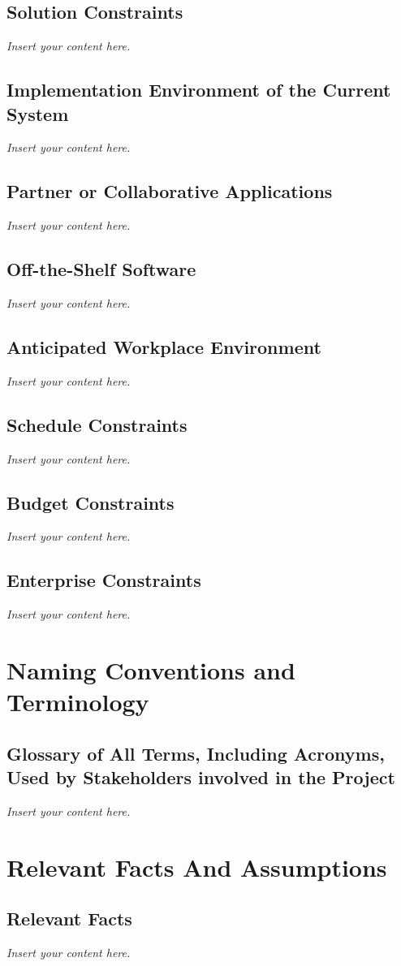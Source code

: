 \documentclass[12pt]{article}
\newcommand{\lips}{\textit{Insert your content here.}}
\begin{document}
\subsection{Solution Constraints}
\lips
\subsection{Implementation Environment of the Current System}
\lips
\subsection{Partner or Collaborative Applications}
\lips
\subsection{Off-the-Shelf Software}
\lips
\subsection{Anticipated Workplace Environment}
\lips
\subsection{Schedule Constraints}
\lips
\subsection{Budget Constraints}
\lips
\subsection{Enterprise Constraints}
\lips

\section{Naming Conventions and Terminology}
\subsection{Glossary of All Terms, Including Acronyms, Used by Stakeholders
involved in the Project}
\lips

\section{Relevant Facts And Assumptions}
\subsection{Relevant Facts}
\lips
\end{document}
